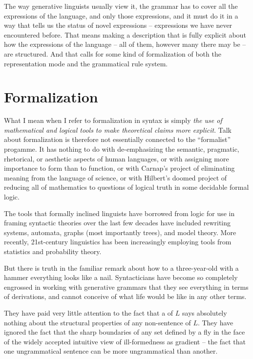 \documentclass[output=paper]{langscibook}
\begin{document}
The way generative linguists usually view it, the grammar has to cover all the expressions of the language, and only those expressions, and it must do it in a way that tells us the status of novel expressions -- expressions we have never encountered before. That means making a description that is fully explicit about how the expressions of the language -- all of them, however many there may be -- are structured. And that calls for some kind of formalization of both the representation mode and the grammatical rule system.

\section{Formalization}
\label{sec:pullum:formalization}

What I mean when I refer to formalization in syntax is simply \emph{the use of mathematical and logical tools to make theoretical claims more explicit}. Talk about formalization is therefore not essentially connected to the ``formalist'' progamme. It has nothing to do with de-emphasizing the semantic, pragmatic, rhetorical, or aesthetic aspects of human languages, or with assigning more importance to form than to function, or with Carnap's project of eliminating meaning from the language of science, or with Hilbert's doomed project of reducing all of mathematics to questions of logical truth in some decidable formal logic.

The tools that formally inclined linguists have borrowed from logic for use in framing syntactic theories over the last few decades have included rewriting systems, automata, graphs (most importantly trees), and model theory.  More recently, 21st-century linguistics has been increasingly employing tools from statistics and probability theory.

But there is truth in the familiar remark about how to a three-year-old with a hammer everything looks like a nail.  Syntacticians have become so completely engrossed in working with generative grammars that they see everything in terms of derivations, and cannot conceive of what life would be like in any other terms.

They have paid very little attention to the fact that a  of $L$ says absolutely nothing about the structural properties of any non-sentence of $L$. They have ignored the fact that the sharp boundaries of any set defined by a  fly in the face of the widely accepted intuitive view of ill-formedness as gradient -- the fact that one ungrammatical sentence can be more ungrammatical than another.
\end{document}
